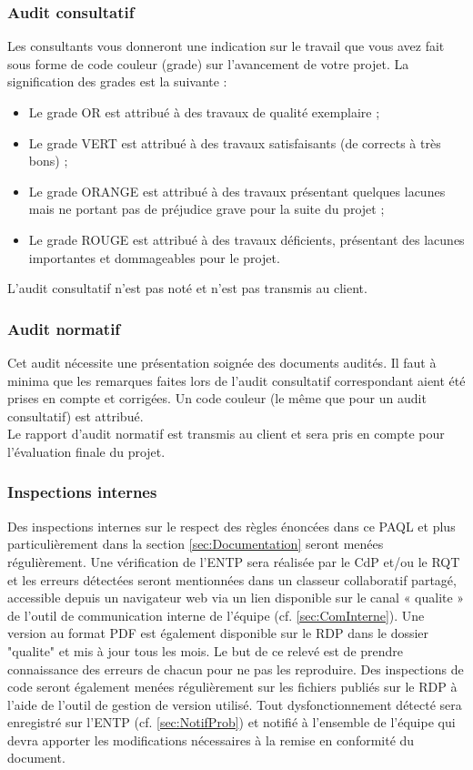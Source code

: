 \documentclass[a4paper,11pt,titlepage]{article}
\begin{document}
\subsubsection{Audit consultatif}
Les consultants vous donneront une indication sur le travail que vous avez
fait sous forme de code couleur (grade) sur l'avancement de votre projet.
La signification des grades est la suivante :
\begin{itemize}
    \item Le grade OR est attribué à des travaux de qualité exemplaire ;
    \item Le grade VERT est attribué à des travaux satisfaisants (de corrects à très bons) ;
    \item Le grade ORANGE est attribué à des travaux présentant quelques lacunes mais ne portant pas de préjudice grave pour la suite du projet ;
    \item Le grade ROUGE est attribué à des travaux déficients, présentant des lacunes importantes et dommageables pour le projet.
\end{itemize}
L'audit consultatif n'est pas noté et n'est pas transmis au client.

\subsubsection{Audit normatif}
Cet audit nécessite une présentation soignée des documents audités. Il
faut à minima que les remarques faites lors de l'audit consultatif
correspondant aient été prises en compte et corrigées. Un code couleur
(le même que pour un audit consultatif) est attribué.\\

Le rapport d'audit normatif est transmis au client et sera pris
en compte pour l'évaluation finale du projet.

\subsubsection{Inspections internes} \label{sec:Insp}
Des inspections internes sur le respect des règles énoncées dans ce PAQL
et plus particulièrement dans la section \ref{sec:Documentation} seront menées régulièrement.
Une vérification de l'ENTP sera réalisée par le CdP et/ou le RQT  et les erreurs
détectées seront mentionnées dans un classeur collaboratif partagé, accessible
depuis un navigateur web via un lien disponible sur le canal « qualite » de l'outil de communication interne de l'équipe (cf. \ref{sec:ComInterne}). Une version au format PDF est également
disponible sur le RDP dans le dossier "qualite" et mis à jour tous les mois. Le but de ce relevé est de prendre
connaissance des erreurs de chacun pour ne pas les reproduire.
Des inspections de code seront également menées régulièrement sur les
fichiers publiés sur le RDP à l'aide de l'outil de gestion de version utilisé. Tout dysfonctionnement détecté sera
enregistré sur l'ENTP (cf. \ref{sec:NotifProb}) et notifié à l'ensemble de l'équipe qui devra
apporter les modifications nécessaires à la remise en conformité du document.
\end{document}
